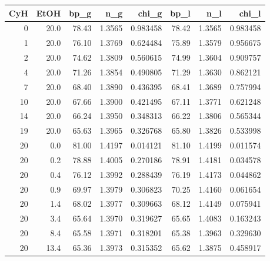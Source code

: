 \begin{tabular}{rrrrrrrr}
\toprule
 CyH &  EtOH &  bp\_g &    n\_g &    chi\_g &  bp\_l &    n\_l &    chi\_l \\
\midrule
   0 &  20.0 & 78.43 & 1.3565 & 0.983458 & 78.42 & 1.3565 & 0.983458 \\
   1 &  20.0 & 76.10 & 1.3769 & 0.624484 & 75.89 & 1.3579 & 0.956675 \\
   2 &  20.0 & 74.62 & 1.3809 & 0.560615 & 74.99 & 1.3604 & 0.909757 \\
   4 &  20.0 & 71.26 & 1.3854 & 0.490805 & 71.29 & 1.3630 & 0.862121 \\
   7 &  20.0 & 68.40 & 1.3890 & 0.436395 & 68.41 & 1.3689 & 0.757994 \\
  10 &  20.0 & 67.66 & 1.3900 & 0.421495 & 67.11 & 1.3771 & 0.621248 \\
  14 &  20.0 & 66.24 & 1.3950 & 0.348313 & 66.22 & 1.3806 & 0.565344 \\
  19 &  20.0 & 65.63 & 1.3965 & 0.326768 & 65.80 & 1.3826 & 0.533998 \\
  20 &   0.0 & 81.00 & 1.4197 & 0.014121 & 81.10 & 1.4199 & 0.011574 \\
  20 &   0.2 & 78.88 & 1.4005 & 0.270186 & 78.91 & 1.4181 & 0.034578 \\
  20 &   0.4 & 76.12 & 1.3992 & 0.288439 & 76.19 & 1.4173 & 0.044862 \\
  20 &   0.9 & 69.97 & 1.3979 & 0.306823 & 70.25 & 1.4160 & 0.061654 \\
  20 &   1.4 & 68.02 & 1.3977 & 0.309663 & 68.12 & 1.4149 & 0.075941 \\
  20 &   3.4 & 65.64 & 1.3970 & 0.319627 & 65.65 & 1.4083 & 0.163243 \\
  20 &   8.4 & 65.58 & 1.3971 & 0.318201 & 65.38 & 1.3963 & 0.329630 \\
  20 &  13.4 & 65.36 & 1.3973 & 0.315352 & 65.62 & 1.3875 & 0.458917 \\
\bottomrule
\end{tabular}
